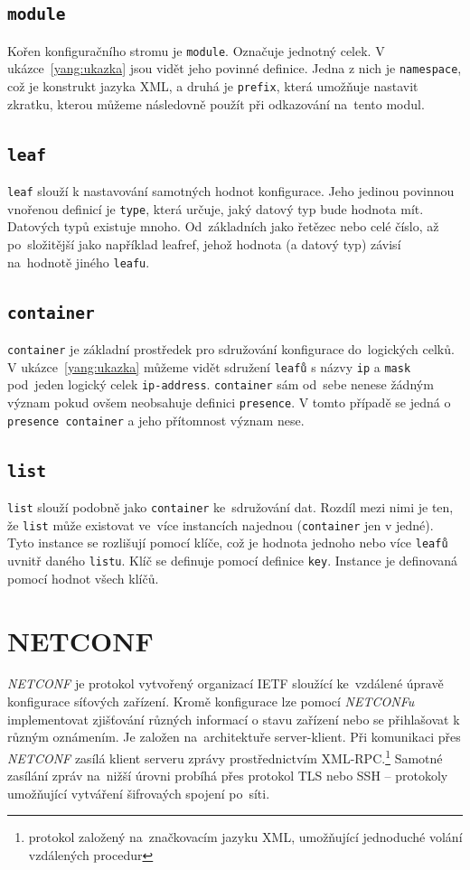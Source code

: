 \documentclass[thesis=B,czech,hidelinks]{FITthesis}[2019/03/06]
\begin{document}
\subsection{\texttt{module}}
Kořen konfiguračního stromu je \texttt{module}. Označuje jednotný celek. V ukázce~\ref{yang:ukazka} jsou vidět jeho povinné definice. Jedna z nich je \texttt{namespace}, což je konstrukt jazyka XML, a druhá je \texttt{prefix}, která umožňuje nastavit zkratku, kterou můžeme následovně použít při odkazování na~tento modul.

\subsection{\texttt{leaf}}
\texttt{leaf} slouží k nastavování samotných hodnot konfigurace. Jeho jedinou povinnou vnořenou definicí je \texttt{type}, která určuje, jaký datový typ bude hodnota mít. Datových typů existuje mnoho. Od~základních jako řetězec nebo celé číslo, až po~složitější jako například leafref, jehož hodnota (a datový typ) závisí na~hodnotě jiného \texttt{leafu}.
\subsection{\texttt{container}}
\texttt{container} je základní prostředek pro sdružování konfigurace do~logických celků. V ukázce~\ref{yang:ukazka} můžeme vidět sdružení \texttt{leafů} s názvy \texttt{ip} a \texttt{mask} pod~jeden logický celek \texttt{ip-address}. \texttt{container} sám od~sebe nenese žádným význam pokud ovšem neobsahuje definici \texttt{presence}. V tomto případě se jedná o \texttt{presence container} a jeho přítomnost význam nese.
\subsection{\texttt{list}}
\texttt{list} slouží podobně jako \texttt{container} ke~sdružování dat. Rozdíl mezi nimi je ten, že \texttt{list} může existovat ve~více instancích najednou (\texttt{container} jen v jedné). Tyto instance se rozlišují pomocí klíče, což je hodnota jednoho nebo více \texttt{leafů} uvnitř daného \texttt{listu}. Klíč se definuje pomocí definice \texttt{key}. Instance je definovaná pomocí hodnot všech klíčů.


\section{NETCONF}
\textit{NETCONF} je protokol vytvořený organizací IETF sloužící ke~vzdálené úpravě konfigurace síťových zařízení. Kromě konfigurace lze pomocí \textit{NETCONFu} implementovat zjišťování různých informací o stavu zařízení nebo se přihlašovat k různým oznámením. Je založen na~architektuře server-klient. Při komunikaci přes \textit{NETCONF} zasílá klient serveru zprávy prostřednictvím XML-RPC.\footnote{protokol založený na~značkovacím jazyku XML, umožňující jednoduché volání vzdálených procedur} Samotné zasílání zpráv na~nižší úrovni probíhá přes protokol TLS nebo SSH -- protokoly umožňující vytváření šifrovaých spojení po~síti.
\end{document}
